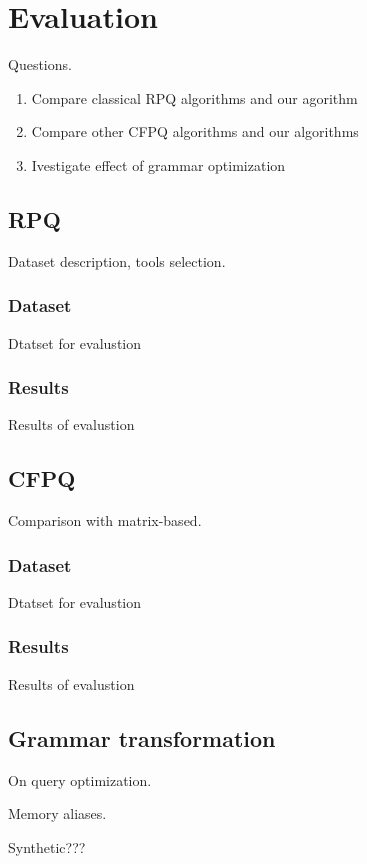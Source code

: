 \section{Evaluation}

Questions.
\begin{enumerate}
	\item Compare classical RPQ algorithms and our agorithm
	\item Compare other CFPQ algorithms and our algorithms
	\item Ivestigate effect of grammar optimization
\end{enumerate}

\subsection{RPQ}

Dataset description, tools selection.

\subsubsection{Dataset}

Dtatset for evalustion

\subsubsection{Results}

Results of evalustion

\subsection{CFPQ}

Comparison with matrix-based.

\subsubsection{Dataset}

Dtatset for evalustion

\subsubsection{Results}

Results of evalustion

\subsection{Grammar transformation}

On query optimization.

Memory aliases.

Synthetic???